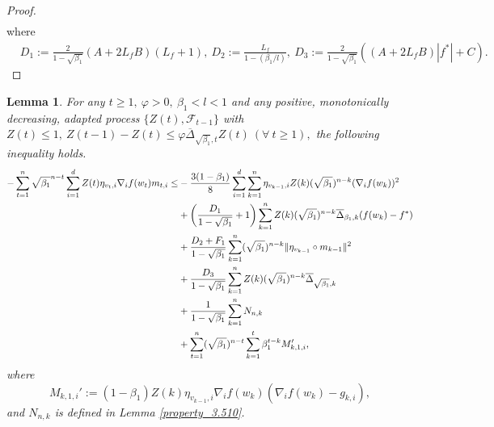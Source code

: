 \documentclass{article} %
\newtheorem{lemma}{Lemma}[section]
\begin{document}
\begin{proof}
\begin{align*}
\end{align*}
where
\begin{align*}
&D_{1}:=\frac{2}{1-\sqrt{\beta_{1}}}(A+2L_{f}B)(L_{f}+1),\ D_{2}:=\frac{L_{f}}{1-(\beta_{1}/l)},\ D_{3}:=\frac{2}{1-\sqrt{\beta_{1}}}\left((A+2L_{f}B)|f^*|+C\right). \tag*{\qedhere}
\end{align*}
\end{proof}

\begin{lemma}\label{lemma__0}
For any \( t \geq 1,\ \varphi>0,\  \beta_{1}< l<1 \) and any positive, monotonically decreasing, adapted process \(\{Z(t), \mathscr{F}_{t-1}\}\) with \( Z(t)\le 1,\ Z(t-1)-Z(t)\le \varphi \overline{\Delta}_{\sqrt{\beta_{1}},t}Z(t)\ (\forall\ t\ge 1),\) the following inequality holds.
\begin{align}\label{0adam_1}
-\sum_{t=1}^{n}\sqrt{\beta_{1}}^{n-t}\sum_{i=1}^{d}Z(t)\eta_{v_{t},i}\nabla_{i}f(w_{t})m_{t,i}\le & -\frac{3(1-\beta_{1})}{8}\sum_{i=1}^{d}\sum_{k=1}^{n}\eta_{v_{k-1},i}Z(k)(\sqrt{\beta_{1}})^{n-k}(\nabla_{i}f(w_{k}))^{2}\notag\\&+\left(\frac{D_{1}}{1-\sqrt{\beta_{1}}}+1\right)\sum_{k=1}^{n}Z(k)(\sqrt{\beta_{1}})^{n-k}\overline{\Delta}_{\beta_{1},k}(f(w_{k})-f^*)\notag\\&+\frac{D_{2}+F_1}{1-\sqrt{\beta_{1}}}\sum_{k=1}^{n}(\sqrt{\beta_{1}})^{n-k}\|\eta_{v_{k-1}}\circ m_{k-1}\|^{2}\notag\\&+\frac{D_{3}}{1-\sqrt{\beta_{1}}}\sum_{k=1}^{n}Z(k)(\sqrt{\beta_{1}})^{n-k}\overline{\Delta}_{\sqrt{\beta_{1}},k}\notag\\&+\frac{{1}}{1-\sqrt{\beta_{1}}}\sum_{k=1}^{n}N_{n,k}\notag\\&+\sum_{t=1}^{n}(\sqrt{\beta_{1}})^{n-t}\sum_{k=1}^{t}\beta_{1}^{t-k}M_{k,1,i}',
\end{align}
where
\[M_{k,1,i}':=(1-\beta_{1})Z(k)\eta_{v_{k-1},i}\nabla_{i}f(w_{k})(\nabla_{i}f(w_{k})-g_{k,i}),\]
and $N_{n,k}$ is defined in Lemma \ref{property_3.510}.
\end{lemma}
\end{document}
